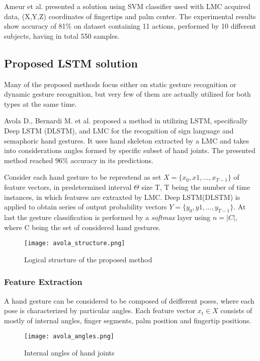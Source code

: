 Ameur et al. \cite{ameur} presented a solution using SVM classifier used with LMC acquired data, (X,Y,Z) coordinates of fingertips and palm center. The experimental results show accuracy of 81\% on dataset containing 11 actions, performed by 10 different subjects, having in total 550 samples.

\subsection{Proposed LSTM solution}

Many of the proposed methods focus either on static gesture recognition or dynamic gesture recognition, but very few of them are actually utilized for both types at the same time. 

Avola D., Bernardi M. et al. proposed a method in \cite{avola} utilizing LSTM, specifically Deep LSTM (DLSTM), and LMC for the recognition of sign language and semaphoric hand gestures. It uses hand skeleton extracted by a LMC and takes into considerations angles formed by specific subset of hand joints. The presented method reached 96\% accuracy in its predictions.

Consider each hand gesture to be represtend as set $X = \{x_0, x1, ..., x_{T-1}\}$ of feature vectors, in predetermined interval $\Theta$ size T, T being the number of time instances, in which features are extraxted by LMC. Deep LSTM(DLSTM) is applied to obtain series of output probability vectors $Y = \{y_0, y1, ..., y_{T-1}\}$. At last the gesture classification is performed by a \textit{softmax} layer using $n = |C|$, where C being the set of considered hand gestures.\cite{avola}

\begin{figure}[ht]
	\centering
    \texttt{[image: avola\_structure.png]}
	\caption{Logical structure of the proposed method \cite{avola}}
	\label{fig:lstm_gesture_structure}
\end{figure}

\subsubsection{Feature Extraction}

A hand gesture can be considered to be composed of deifferent poses, where each pose is characterized by particular angles. Each feature vector $x_t \in X$ consists of mostly of internal angles, finger segments, palm position and fingertip positions.

\begin{figure}[ht]
	\centering
    \texttt{[image: avola\_angles.png]}
	\caption{Internal angles of hand joints \cite{avola}}
	\label{fig:lstm_angles}
\end{figure}

